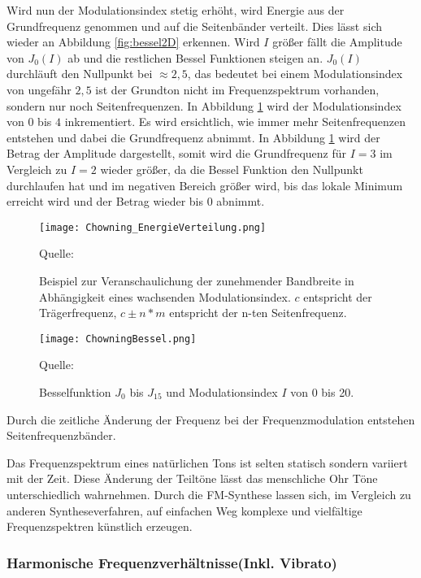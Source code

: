 Wird nun der Modulationsindex stetig erhöht, wird Energie aus der Grundfrequenz genommen und auf die Seitenbänder verteilt. Dies lässt sich wieder an Abbildung \ref{fig:bessel2D} erkennen. Wird $I$ größer fällt die Amplitude von $J_0(I)$ ab und die restlichen Bessel Funktionen steigen an. $J_0(I)$ durchläuft den Nullpunkt bei $\approx2,5$, das bedeutet bei einem Modulationsindex von ungefähr $2,5$ ist der Grundton nicht im Frequenzspektrum vorhanden, sondern nur noch Seitenfrequenzen. In Abbildung \ref{fig:chowningEnergieVerteilung} wird der Modulationsindex von $0$ bis $4$ inkrementiert. Es wird ersichtlich, wie immer mehr Seitenfrequenzen entstehen und dabei die Grundfrequenz abnimmt. In Abbildung \ref{fig:chowningEnergieVerteilung} wird der Betrag der Amplitude dargestellt, somit wird die Grundfrequenz für $I=3$ im Vergleich zu $I=2$ wieder größer, da die Bessel Funktion den Nullpunkt durchlaufen hat und im negativen Bereich größer wird, bis das lokale Minimum erreicht wird und der Betrag wieder bis $0$ abnimmt.

\begin{figure} [ht]
\centering
  \texttt{[image: Chowning\_EnergieVerteilung.png]}
\caption{Beispiel zur Veranschaulichung der zunehmender Bandbreite in Abhängigkeit eines wachsenden Modulationsindex. $c$ entspricht der Trägerfrequenz, $c\pm n*m$ entspricht der n-ten Seitenfrequenz.}
\label{fig:chowningEnergieVerteilung}
Quelle: \cite{chowningPaper}
\end{figure}



\begin{figure} [ht]
\centering
  \texttt{[image: ChowningBessel.png]}
\caption{Besselfunktion $J_0$ bis $J_{15}$ und Modulationsindex $I$ von 0 bis 20. }
\label{fig:bessel3D}
Quelle: \cite{chowningPaper}
\end{figure}



Durch die zeitliche Änderung der Frequenz bei der Frequenzmodulation entstehen Seitenfrequenzbänder.


Das Frequenzspektrum eines natürlichen Tons ist selten statisch sondern variiert mit der Zeit. Diese Änderung der Teiltöne lässt das menschliche Ohr Töne unterschiedlich wahrnehmen. Durch die FM-Synthese lassen sich, im Vergleich zu anderen Syntheseverfahren, auf einfachen Weg komplexe und vielfältige Frequenzspektren künstlich erzeugen.

\FloatBarrier
\subsubsection{Harmonische Frequenzverhältnisse(Inkl. Vibrato)}


\FloatBarrier